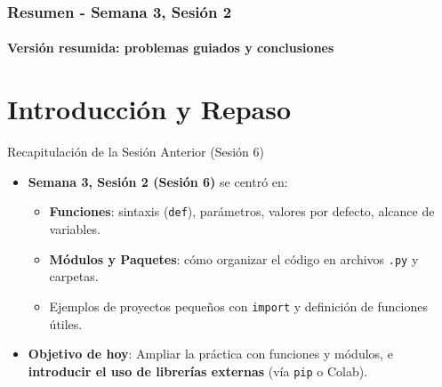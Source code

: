 \documentclass[10pt]{beamer}
\begin{document}
\myfront{}

\begin{frame}
  \titlepage
\end{frame}

\begin{frame}
  \frametitle{Resumen - Semana 3, Sesión 2}
  \framesubtitle{Versión resumida: problemas guiados y conclusiones}
  \tableofcontents
\end{frame}


\iffalse
\section{Introducción y Repaso}

\begin{frame}{Recapitulación de la Sesión Anterior (Sesión 6)}
  \begin{itemize}
    \item \textbf{Semana 3, Sesión 2 (Sesión 6)} se centró en:
      \begin{itemize}
        \item \textbf{Funciones}: sintaxis (\texttt{def}), parámetros, valores por defecto, alcance de variables.
        \item \textbf{Módulos y Paquetes}: cómo organizar el código en archivos \texttt{.py} y carpetas.
        \item Ejemplos de proyectos pequeños con \texttt{import} y definición de funciones útiles.
      \end{itemize}
    \item \textbf{Objetivo de hoy}: Ampliar la práctica con funciones y módulos, e \textbf{introducir el uso de librerías externas} (vía \texttt{pip} o Colab).
  \end{itemize}
\end{frame}
\end{document}
